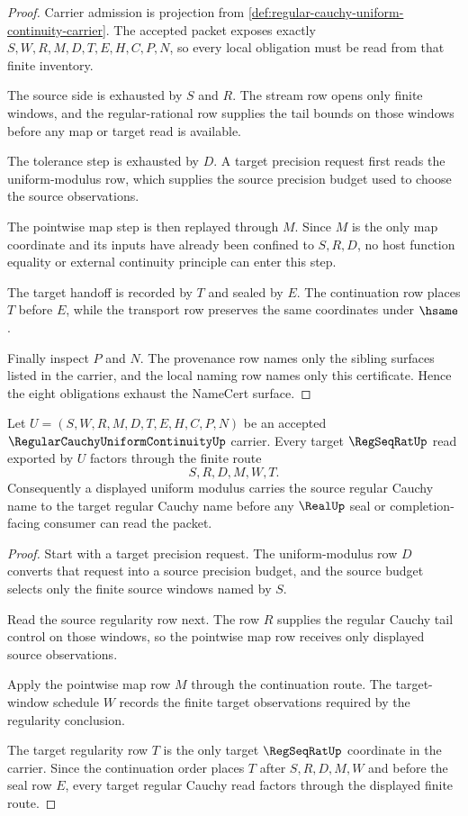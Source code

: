 \begin{proof}
Carrier admission is projection from \autoref{def:regular-cauchy-uniform-continuity-carrier}. The accepted packet exposes exactly $S,W,R,M,D,T,E,H,C,P,N$, so every local obligation must be read from that finite inventory.

The source side is exhausted by $S$ and $R$. The stream row opens only finite windows, and the regular-rational row supplies the tail bounds on those windows before any map or target read is available.

The tolerance step is exhausted by $D$. A target precision request first reads the uniform-modulus row, which supplies the source precision budget used to choose the source observations.

The pointwise map step is then replayed through $M$. Since $M$ is the only map coordinate and its inputs have already been confined to $S,R,D$, no host function equality or external continuity principle can enter this step.

The target handoff is recorded by $T$ and sealed by $E$. The continuation row places $T$ before $E$, while the transport row preserves the same coordinates under $\hsame$.

Finally inspect $P$ and $N$. The provenance row names only the sibling surfaces listed in the carrier, and the local naming row names only this certificate. Hence the eight obligations exhaust the NameCert surface.
\end{proof}

\begin{theorem}
\label{thm:regular-cauchy-uniform-continuity-regseqrat-handoff}
Let $U=(S,W,R,M,D,T,E,H,C,P,N)$ be an accepted $\RegularCauchyUniformContinuityUp$ carrier. Every target $\RegSeqRatUp$ read exported by $U$ factors through the finite route
$$
S,R,D,M,W,T .
$$
Consequently a displayed uniform modulus carries the source regular Cauchy name to the target regular Cauchy name before any $\RealUp$ seal or completion-facing consumer can read the packet.
\end{theorem}
\begin{proof}
Start with a target precision request. The uniform-modulus row $D$ converts that request into a source precision budget, and the source budget selects only the finite source windows named by $S$.

Read the source regularity row next. The row $R$ supplies the regular Cauchy tail control on those windows, so the pointwise map row receives only displayed source observations.

Apply the pointwise map row $M$ through the continuation route. The target-window schedule $W$ records the finite target observations required by the regularity conclusion.

The target regularity row $T$ is the only target $\RegSeqRatUp$ coordinate in the carrier. Since the continuation order places $T$ after $S,R,D,M,W$ and before the seal row $E$, every target regular Cauchy read factors through the displayed finite route.
\end{proof}

